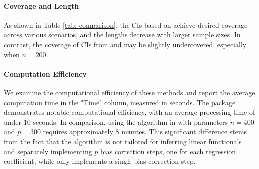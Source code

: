 \paragraph{Coverage and Length} As shown in Table \ref{tab: comparison}, the CIs based on  achieve desired coverage across various scenarios, and the lengths decrease with larger sample sizes. In contrast, the coverage of CIs from  and  may be slightly undercovered, especially when $n=200$.
\vspace{-5mm}
\paragraph{Computation Efficiency}
We examine the computational efficiency of these methods and report the average computation time in the "Time" column, measured in seconds. The  package demonstrates notable computational efficiency, with an average processing time of under 10 seconds. In comparison, using the algorithm in  with parameters $n=400$ and $p=300$ requires approximately 8 minutes. This significant difference stems from the fact that the  algorithm is not tailored for inferring linear functionals and separately implementing $p$ bias correction steps, one for each regression coefficient, while  only implements a single bias correction step.

